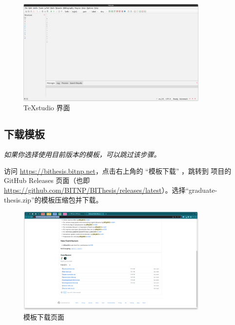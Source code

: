 \begin{figure}[H]
  \begin{center}
    \includegraphics[width=0.85\textwidth]{imgs/texstudio-overview.png}
  \end{center}
  \caption{TeXstudio 界面}
  \label{fig:texstudio-overview}
\end{figure}

\subsection{下载模板}

\textit{如果你选择使用目前版本的模板，可以跳过该步骤。}

访问 \url{https://bithesis.bitnp.net}，点击右上角的 ``模板下载'' ，跳转到 \BIThesis 项目的 GitHub Releases 页面（也即 \url{https://github.com/BITNP/BIThesis/releases/latest}）。选择``graduate-thesis.zip''的模板压缩包并下载。

\begin{figure}[H]
  \begin{center}
    \includegraphics[width=0.85\textwidth]{imgs/github-releases.png}
  \end{center}
  \caption{模板下载页面}
  \label{fig:local-template-download}
\end{figure}

